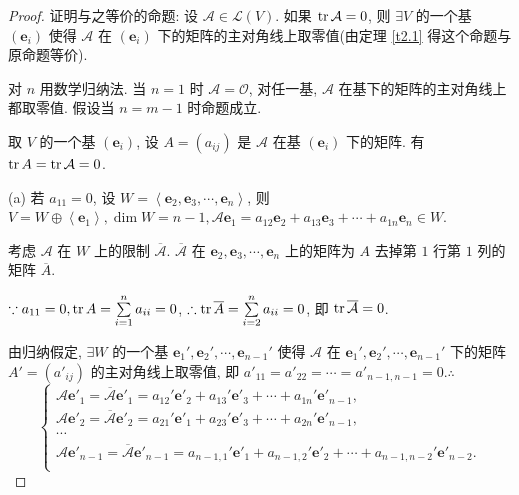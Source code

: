 \documentclass{ctexart}
\begin{document}
\begin{proof}
    证明与之等价的命题: 设 $\mathcal{A}\in\mathcal{L}(V)$. 如果 $\operatorname{tr} \mathcal{A}=0$, 则 $\exists V$ 的一个基 $(\boldsymbol{e}_i)$ 使得 $\mathcal{A}$ 在 $(\boldsymbol{e}_i)$ 下的矩阵的主对角线上取零值(由定理 \ref{t2.1} 得这个命题与原命题等价).

    对 $n$ 用数学归纳法. 当 $n=1$ 时 $\mathcal{A}=\mathcal{O}$, 对任一基, $\mathcal{A}$ 在基下的矩阵的主对角线上都取零值. 假设当 $n=m-1$ 时命题成立.

    取 $V$ 的一个基 $(\boldsymbol{e}_i)$, 设 $A=(a_{ij})$ 是 $\mathcal{A}$ 在基 $(\boldsymbol{e}_i)$ 下的矩阵. 有 $\operatorname{tr} A=\operatorname{tr} \mathcal{A}=0$.

    (a) 若 $a_{11}=0$, 设 $W=\left<\boldsymbol{e}_2,\boldsymbol{e}_3,\cdots,\boldsymbol{e}_n\right>$, 则 $V=W\oplus\left<\boldsymbol{e}_1\right>,\dim W=n-1,\mathcal{A}\boldsymbol{e}_1=a_{12}\boldsymbol{e}_2+a_{13}\boldsymbol{e}_3+\cdots+a_{1n}\boldsymbol{e}_n\in W$.
    
    考虑 $\mathcal{A}$ 在 $W$ 上的限制 $\overline{\mathcal{A}}$. $\overline{\mathcal{A}}$ 在 $\boldsymbol{e}_2,\boldsymbol{e}_3,\cdots,\boldsymbol{e}_n$ 上的矩阵为 $A$ 去掉第 $1$ 行第 $1$ 列的矩阵 $\overline{A}$.
    
    $\because a_{11}=0,\operatorname{tr} A=\sum\limits_{i=1}^na_{ii}=0$, $\therefore\operatorname{tr} \overline{A}=\sum\limits_{i=2}^na_{ii}=0$, 即 $\operatorname{tr} \overline{\mathcal{A}}=0$.
    
    由归纳假定, $\exists W$ 的一个基 $\boldsymbol{e}_1',\boldsymbol{e}_2',\cdots,\boldsymbol{e}_{n-1}'$ 使得 $\mathcal{A}$ 在 $\boldsymbol{e}_1',\boldsymbol{e}_2',\cdots,\boldsymbol{e}_{n-1}'$ 下的矩阵 $A'=(a'_{ij})$ 的主对角线上取零值, 即 $a'_{11}=a'_{22}=\cdots=a'_{n-1,n-1}=0.\therefore$
    \[\begin{cases}
        \mathcal{A}\boldsymbol{e}'_1=\overline{\mathcal{A}}\boldsymbol{e}'_1=a_{12}'\boldsymbol{e}'_2+a_{13}'\boldsymbol{e}'_3+\cdots+a_{1n}'\boldsymbol{e}'_{n-1}, \\
        \mathcal{A}\boldsymbol{e}'_2=\overline{\mathcal{A}}\boldsymbol{e}'_2=a_{21}'\boldsymbol{e}'_1+a_{23}'\boldsymbol{e}'_3+\cdots+a_{2n}'\boldsymbol{e}'_{n-1}, \\
        \cdots \\
        \mathcal{A}\boldsymbol{e}'_{n-1}=\overline{\mathcal{A}}\boldsymbol{e}'_{n-1}=a_{n-1,1}'\boldsymbol{e}'_1+a_{n-1,2}'\boldsymbol{e}'_2+\cdots+a_{n-1,n-2}'\boldsymbol{e}'_{n-2}. \\
    \end{cases}\]
    

\end{proof}
\end{document}
